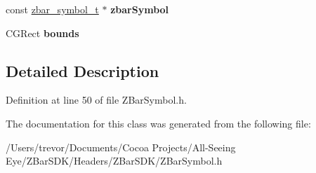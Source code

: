 \begin{DoxyCompactItemize}
\item 
\hypertarget{interface_z_bar_symbol_a96e9b61c7923057f1fa792c9321f1fa9}{
const \hyperlink{zbar_8h_a55b659c1945f2984b5ec8386127e5c43}{zbar\_\-symbol\_\-t} $\ast$ {\bfseries zbarSymbol}}
\label{interface_z_bar_symbol_a96e9b61c7923057f1fa792c9321f1fa9}

\item 
\hypertarget{interface_z_bar_symbol_ac79d99d613046100f027357a46b793aa}{
CGRect {\bfseries bounds}}
\label{interface_z_bar_symbol_ac79d99d613046100f027357a46b793aa}

\end{DoxyCompactItemize}


\subsection{Detailed Description}


Definition at line 50 of file ZBarSymbol.h.



The documentation for this class was generated from the following file:\begin{DoxyCompactItemize}
\item 
/Users/trevor/Documents/Cocoa Projects/All-\/Seeing Eye/ZBarSDK/Headers/ZBarSDK/ZBarSymbol.h\end{DoxyCompactItemize}
